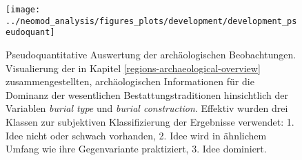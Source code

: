 \documentclass[openany,twoside,twocolumn]{book}
\begin{document}
\begin{figure}[!t]

{\centering \texttt{[image: ../neomod\_analysis/figures\_plots/development/development\_pseudoquant]} 

}

\caption[Pseudoquantitative Auswertung der archäologischen Beobachtungen]{Pseudoquantitative Auswertung der archäologischen Beobachtungen. Visualierung der in Kapitel \ref{regions-archaeological-overview} zusammengestellten, archäologischen Informationen für die Dominanz der wesentlichen Bestattungstraditionen hinsichtlich der Variablen \textit{burial type} und \textit{burial construction}. Effektiv wurden drei Klassen zur subjektiven Klassifizierung der Ergebnisse verwendet: 1. Idee nicht oder schwach vorhanden, 2. Idee wird in ähnlichem Umfang wie ihre Gegenvariante praktiziert, 3. Idee dominiert.}\label{fig:development-proportions-regions-pseudoquant}
\end{figure}
\end{document}
